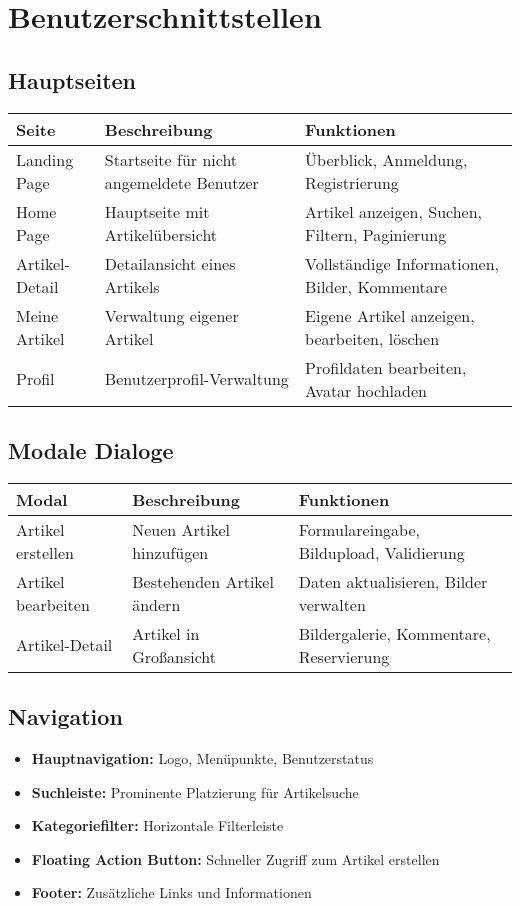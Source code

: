 \documentclass[a4paper,12pt]{article}
\begin{document}
\section{Benutzerschnittstellen}

\subsection{Hauptseiten}
\begin{longtable}{|p{}|p{}|p{}|}
\hline
\textbf{Seite} & \textbf{Beschreibung} & \textbf{Funktionen} \\
\hline
Landing Page & Startseite für nicht angemeldete Benutzer & Überblick, Anmeldung, Registrierung \\
\hline
Home Page & Hauptseite mit Artikelübersicht & Artikel anzeigen, Suchen, Filtern, Paginierung \\
\hline
Artikel-Detail & Detailansicht eines Artikels & Vollständige Informationen, Bilder, Kommentare \\
\hline
Meine Artikel & Verwaltung eigener Artikel & Eigene Artikel anzeigen, bearbeiten, löschen \\
\hline
Profil & Benutzerprofil-Verwaltung & Profildaten bearbeiten, Avatar hochladen \\
\hline
\end{longtable}

\subsection{Modale Dialoge}
\begin{longtable}{|p{}|p{}|p{}|}
\hline
\textbf{Modal} & \textbf{Beschreibung} & \textbf{Funktionen} \\
\hline
Artikel erstellen & Neuen Artikel hinzufügen & Formulareingabe, Bildupload, Validierung \\
\hline
Artikel bearbeiten & Bestehenden Artikel ändern & Daten aktualisieren, Bilder verwalten \\
\hline
Artikel-Detail & Artikel in Großansicht & Bildergalerie, Kommentare, Reservierung \\
\hline
\end{longtable}

\subsection{Navigation}
\begin{itemize}
    \item \textbf{Hauptnavigation:} Logo, Menüpunkte, Benutzerstatus
    \item \textbf{Suchleiste:} Prominente Platzierung für Artikelsuche
    \item \textbf{Kategoriefilter:} Horizontale Filterleiste
    \item \textbf{Floating Action Button:} Schneller Zugriff zum Artikel erstellen
    \item \textbf{Footer:} Zusätzliche Links und Informationen
\end{itemize}
\end{document}

